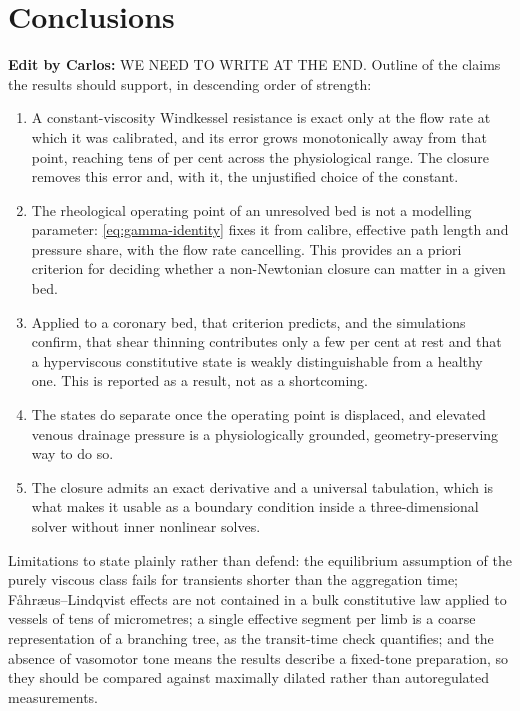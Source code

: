 \documentclass[lineno]{jfm}
\newcommand{\cbp}[1]{{\color{blue} \textbf{Edit by Carlos:} #1}}
\begin{document}
\section{Conclusions}
\label{sec:conclusions}

\cbp{
WE NEED TO WRITE AT THE END. Outline of the claims the results should support,
in descending order of strength:

\begin{enumerate}
\item A constant-viscosity Windkessel resistance is exact only at the flow rate at
which it was calibrated, and its error grows monotonically away from that point,
reaching tens of per cent across the physiological range. The closure removes this
error and, with it, the unjustified choice of the constant.
\item The rheological operating point of an unresolved bed is not a modelling
parameter: \eqref{eq:gamma-identity} fixes it from calibre, effective path length
and pressure share, with the flow rate cancelling. This provides an a priori
criterion for deciding whether a non-Newtonian closure can matter in a given bed.
\item Applied to a coronary bed, that criterion predicts, and the simulations
confirm, that shear thinning contributes only a few per cent at rest and that a
hyperviscous constitutive state is weakly distinguishable from a healthy one. This
is reported as a result, not as a shortcoming.
\item The states do separate once the operating point is displaced, and elevated
venous drainage pressure is a physiologically grounded, geometry-preserving way to
do so.
\item The closure admits an exact derivative and a universal tabulation, which is
what makes it usable as a boundary condition inside a three-dimensional solver
without inner nonlinear solves.
\end{enumerate}

Limitations to state plainly rather than defend: the equilibrium assumption of the
purely viscous class fails for transients shorter than the aggregation time;
Fåhræus--Lindqvist effects are not contained in a bulk constitutive law applied to
vessels of tens of micrometres; a single effective segment per limb is a coarse
representation of a branching tree, as the transit-time check quantifies; and the
absence of vasomotor tone means the results describe a fixed-tone preparation, so
they should be compared against maximally dilated rather than autoregulated
measurements.
}
\end{document}
